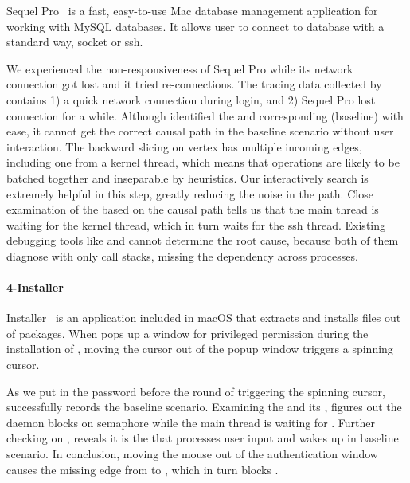 Sequel Pro~\cite{SequelPro} is a fast, easy-to-use Mac database management
application for working with MySQL databases. It allows user to connect to
database with a standard way, socket or ssh.

We experienced the non-responsiveness of Sequel Pro while its network connection
got lost and it tried re-connections. The tracing data collected by \xxx
contains 1) a quick network connection during login, and 2) Sequel Pro lost
connection for a while. Although \xxx identified the \spinningnode and
corresponding (baseline) \similarnode with ease, it cannot get the correct
causal path in the baseline scenario without user interaction. The backward
slicing on vertex has multiple incoming edges, including one from a kernel
thread, which means that operations are likely to be batched together and
inseparable by heuristics. Our interactively search is extremely helpful
in this step, greatly reducing the noise in the path. Close examination of
the \spinningnode based on the causal path tells us that the main thread is
waiting for the kernel thread, which in turn waits for the ssh thread. Existing
debugging tools like  and  cannot determine the
root cause, because both of them diagnose with only call stacks, missing the
dependency across processes.

\paragraph{4-Installer}

Installer~\cite{Installer} is an application included in macOS that extracts and
installs files out of  packages. When  pops up a window
for privileged permission during the installation of ,
moving the cursor out of the popup window triggers a spinning cursor.

As we put in the password before the round of triggering the spinning cursor,
\xxx successfully records the baseline scenario. Examining the \spinningnode and
its \similarnode, \xxx figures out the daemon  blocks on semaphore
while the main thread is waiting for . Further checking on ,
\xxx reveals it is the  that processes user input and wakes
up  in baseline scenario. In conclusion, moving the mouse out of the
authentication window causes the missing edge from  to
, which in turn blocks .

